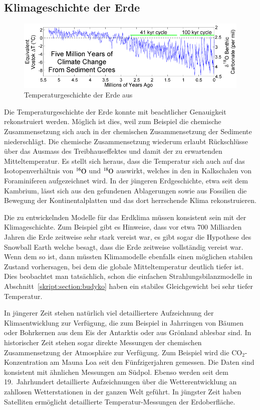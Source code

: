 \subsection{Klimageschichte der Erde\label{subsection:klimageschichte}}
\begin{figure}
\centering
\includegraphics[width=0.7\hsize]{chapters/1/FiveMyrClimateChange.png}
\caption{Temperaturgeschichte der Erde aus 
\cite{skript:geologictemperaturerecord}
\label{skript:history:temperatur}}
\end{figure}%
Die Temperaturgeschichte der Erde konnte mit beachtlicher
Genauigkeit rekonstruiert werden.
Möglich ist dies, weil zum Beispiel die chemische Zusammensetzung sich
auch in der chemischen Zusammensetzung der Sedimente niederschlägt.
Die chemische Zusammensetzung wiederum erlaubt Rückschlüsse über das
Ausmass des Treibhauseffektes und damit der zu erwartenden Mitteltemperatur.
Es stellt sich heraus, dass die Temperatur sich auch auf das
Isotopenverhältnis von $\mathstrut^{16}\text{O}$ und
$\mathstrut^{18}\text{O}$ auswirkt, welches in den in Kalkschalen von
Foraminiferen
%
aufgezeichnet wird.
In der jüngeren Erdgeschichte, etwa seit dem Kambrium, lässt sich aus
%
den gefundenen Ablagerungen sowie aus Fossilien die Bewegung der
Kontinentalplatten und das dort herrschende Klima rekonstruieren.

Die zu entwickelnden Modelle für das Erdklima müssen konsistent sein
mit der Klimageschichte.
Zum Beispiel gibt es Hinweise, dass vor etwa 700 Milliarden Jahren die
Erde zeitweise sehr stark vereist war, es gibt sogar die Hypothese des
Snowball Earth welche besagt, dass die Erde zeitweise vollständig
%
vereist war.
Wenn dem so ist, dann müssten Klimamodelle ebenfalls einen möglichen
stabilen Zustand
vorhersagen, bei dem die globale Mitteltemperatur deutlich tiefer ist.
Dies beobachtet man tatsächlich, schon die einfachen
Strahlungsbilanzmodelle in Abschnitt~\ref{skript:section:budyko}
haben ein stabiles Gleichgewicht bei sehr tiefer Temperatur.

In jüngerer Zeit stehen natürlich viel detailliertere Aufzeichnung der
Klimaentwicklung zur Verfügung, die zum Beispiel in Jahrringen von Bäumen
oder Bohrkernen aus dem Eis der Antarktis oder aus Grönland ablesbar sind.
In historischer Zeit stehen sogar direkte Messungen der chemischen
Zusammensetzung der Atmosphäre zur Verfügung.
Zum Beispiel wird die $\text{CO}_2$-Konzentration am Mauna Loa seit den 
Fünfzigerjahren gemessen.
Die Daten sind konsistent mit ähnlichen Messungen am Südpol.
Ebenso werden seit dem 19.~Jahrhundert detaillierte Aufzeichnungen
über die Wetterentwicklung an zahllosen Wetterstationen in der ganzen
Welt geführt.
In jüngster Zeit haben Satelliten ermöglicht detaillierte
Temperatur-Messungen der Erdoberfläche.

